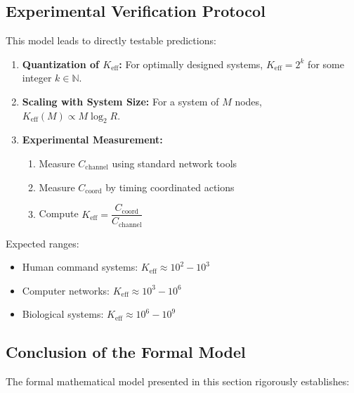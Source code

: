 \documentclass[11pt,a4paper]{article}
\begin{document}
\subsection{Experimental Verification Protocol}

This model leads to directly testable predictions:

\begin{enumerate}
	\item \textbf{Quantization of $K_{\mathrm{eff}}$:} For optimally designed systems, $K_{\mathrm{eff}} = 2^k$ for some integer $k \in \mathbb{N}$.
	
	\item \textbf{Scaling with System Size:} For a system of $M$ nodes, $K_{\mathrm{eff}}(M) \propto M \log_2 R$.
	
	\item \textbf{Experimental Measurement:} 
	\begin{enumerate}
		\item Measure $C_{\text{channel}}$ using standard network tools
		\item Measure $C_{\text{coord}}$ by timing coordinated actions
		\item Compute $K_{\mathrm{eff}} = \dfrac{C_{\text{coord}}}{C_{\text{channel}}}$
	\end{enumerate}
\end{enumerate}

Expected ranges:
\begin{itemize}
	\item Human command systems: $K_{\mathrm{eff}} \approx 10^2 - 10^3$
	\item Computer networks: $K_{\mathrm{eff}} \approx 10^3 - 10^6$
	\item Biological systems: $K_{\mathrm{eff}} \approx 10^6 - 10^9$
\end{itemize}

\subsection{Conclusion of the Formal Model}

The formal mathematical model presented in this section rigorously establishes:
\end{document}

